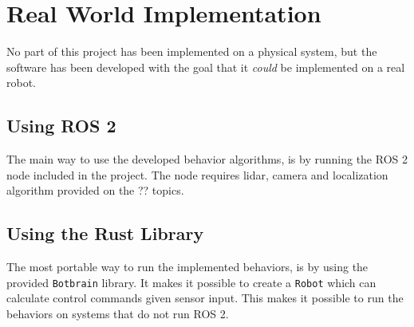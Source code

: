 \section{Real World Implementation}
No part of this project has been implemented on a physical system, but the software has been developed with the goal that it \emph{could} be implemented on a real robot.

\subsection{Using ROS 2}
The main way to use the developed behavior algorithms, is by running the ROS 2 node included in the project. The node requires {\color{red} lidar, camera and localization algorithm provided on the ?? topics}.

\subsection{Using the Rust Library}
The most portable way to run the implemented behaviors, is by using the {\color{red} provided} \texttt{Botbrain} library. It makes it possible to create a \texttt{Robot} which can calculate control commands given sensor input. This makes it possible to run the behaviors on systems that do not run ROS 2.

